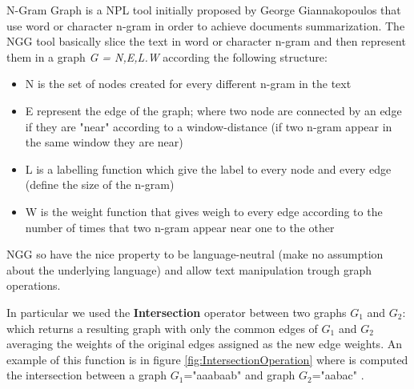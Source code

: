 N-Gram Graph is a NPL tool initially proposed by George Giannakopoulos\cite{Ngram} that use word or character n-gram in order to achieve documents summarization. The NGG tool basically slice the text in word or character n-gram and then represent them in a graph \emph{G = {N,E,L.W}} according the following structure:
\begin{itemize}
	\item N is the set of nodes created for every different n-gram in the text
	\item E represent the edge of the graph; where two node are connected by an edge if they are "near" according to a window-distance (if two n-gram appear in the same window they are near)
	\item L is a labelling function which give the label to every node and every edge (define the size of the n-gram)
	\item W is the weight function that gives weigh to every edge according to the number of times that two n-gram appear near one to the other
\end{itemize}

NGG so have the nice property to be language-neutral (make no assumption about the underlying language) and allow text manipulation trough graph operations.

In particular we used the \textbf{Intersection} operator between two graphs $G_1$ and $G_2$: which returns a resulting graph with only the common edges of $G_1$ and $G_2$ averaging the weights of the original edges assigned as the new edge weights. An example of this function is in figure \ref{fig:IntersectionOperation} where is computed the intersection between a graph $G_1$="aaabaab" and graph $G_2$="aabac" .

